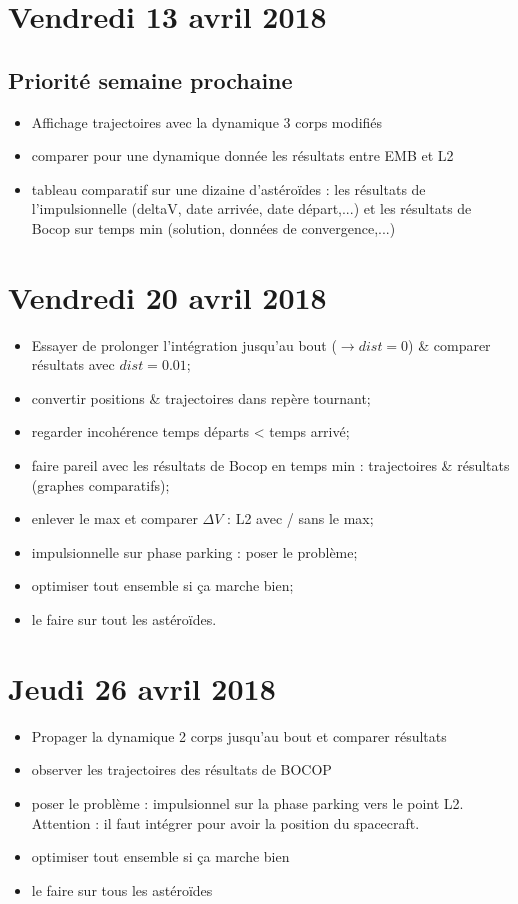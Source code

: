 \documentclass[fleqn,%
a4paper,11pt]{scrbook}
\begin{document}
\newpage
\section*{Vendredi 13 avril 2018}
\subsection*{Priorité semaine prochaine}
\begin{itemize}
	\item Affichage trajectoires avec la dynamique 3 corps modifiés
	\item comparer pour une dynamique donnée les résultats entre EMB et L2
	\item tableau comparatif sur une dizaine d'astéroïdes : les résultats de l'impulsionnelle (deltaV, date arrivée, date départ,...)  et les résultats de Bocop  sur temps min (solution, données de convergence,...)
\end{itemize}

\section*{Vendredi 20 avril 2018}
\begin{itemize}
	\item Essayer de prolonger l'intégration jusqu'au bout ($\rightarrow dist = 0$) \& comparer résultats avec $dist = 0.01$;
	\item convertir positions \& trajectoires dans repère tournant;
	\item regarder incohérence temps départs < temps arrivé;
	\item faire pareil avec les résultats de Bocop en temps min : trajectoires \& résultats (graphes comparatifs);
	\item enlever le max et comparer $\Delta V$ : L2 avec / sans le max;
	\item impulsionnelle sur phase parking : poser le problème;
	\item optimiser tout ensemble si ça marche bien;
	\item le faire sur tout les astéroïdes.
\end{itemize}

\section*{Jeudi 26 avril 2018}
	\begin{itemize}
		\item Propager la dynamique 2 corps jusqu'au bout et comparer 					résultats
		\item observer les trajectoires des résultats de BOCOP
		\item poser le problème : impulsionnel sur la phase parking vers le 			point L2. Attention : il faut intégrer pour avoir la position 				du spacecraft.
		\item optimiser tout ensemble si ça marche bien
		\item le faire sur tous les astéroïdes
	\end{itemize}
\end{document}
